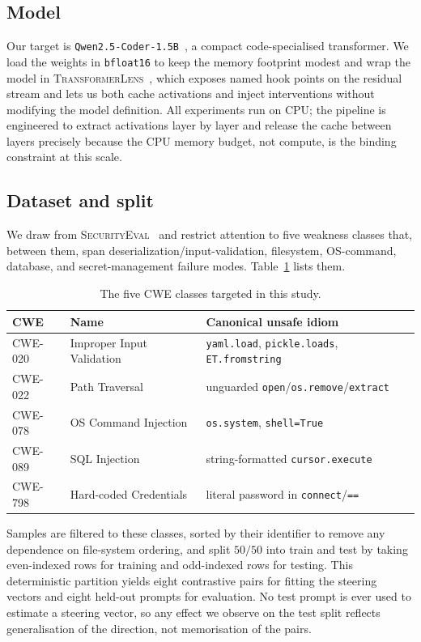 \documentclass[11pt,a4paper]{article}
\begin{document}
\subsection{Model}
Our target is \texttt{Qwen2.5-Coder-1.5B}~\cite{hui2024qwen25coder}, a compact code-specialised transformer. We load the weights in \texttt{bfloat16} to keep the memory footprint modest and wrap the model in \textsc{TransformerLens}~\cite{nanda2022transformerlens}, which exposes named hook points on the residual stream and lets us both cache activations and inject interventions without modifying the model definition. All experiments run on CPU; the pipeline is engineered to extract activations layer by layer and release the cache between layers precisely because the CPU memory budget, not compute, is the binding constraint at this scale.

\subsection{Dataset and split}
We draw from \textsc{SecurityEval}~\cite{siddiq2022securityeval} and restrict attention to five weakness classes that, between them, span deserialization/input-validation, filesystem, OS-command, database, and secret-management failure modes. Table~\ref{tab:cwes} lists them.

\begin{table}[t]
\centering
\caption{The five CWE classes targeted in this study.}
\label{tab:cwes}
\begin{tabular}{lll}
\toprule
\textbf{CWE} & \textbf{Name} & \textbf{Canonical unsafe idiom} \\
\midrule
CWE-020 & Improper Input Validation & \texttt{yaml.load}, \texttt{pickle.loads}, \texttt{ET.fromstring} \\
CWE-022 & Path Traversal & unguarded \texttt{open}\slash\texttt{os.remove}\slash\texttt{extract} \\
CWE-078 & OS Command Injection & \texttt{os.system}, \texttt{shell=True} \\
CWE-089 & SQL Injection & string-formatted \texttt{cursor.execute} \\
CWE-798 & Hard-coded Credentials & literal password in \texttt{connect}\slash\texttt{==} \\
\bottomrule
\end{tabular}
\end{table}

Samples are filtered to these classes, sorted by their identifier to remove any dependence on file-system ordering, and split $50/50$ into train and test by taking even-indexed rows for training and odd-indexed rows for testing. This deterministic partition yields eight contrastive pairs for fitting the steering vectors and eight held-out prompts for evaluation. No test prompt is ever used to estimate a steering vector, so any effect we observe on the test split reflects generalisation of the direction, not memorisation of the pairs.
\end{document}
